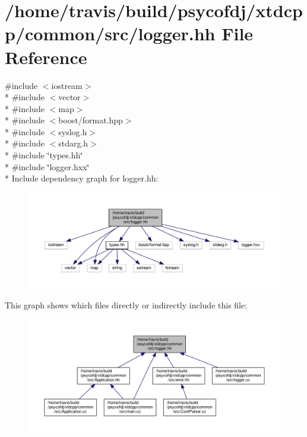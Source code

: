 \hypertarget{logger_8hh}{\section{/home/travis/build/psycofdj/xtdcpp/common/src/logger.hh File Reference}
\label{logger_8hh}
}
{\ttfamily \#include $<$iostream$>$}\\*
{\ttfamily \#include $<$vector$>$}\\*
{\ttfamily \#include $<$map$>$}\\*
{\ttfamily \#include $<$boost/format.\-hpp$>$}\\*
{\ttfamily \#include $<$syslog.\-h$>$}\\*
{\ttfamily \#include $<$stdarg.\-h$>$}\\*
{\ttfamily \#include \char`\"{}types.\-hh\char`\"{}}\\*
{\ttfamily \#include \char`\"{}logger.\-hxx\char`\"{}}\\*
Include dependency graph for logger.\-hh\-:
\nopagebreak
\begin{figure}[H]
\begin{center}
\leavevmode
\includegraphics[width=350pt]{logger_8hh__incl}
\end{center}
\end{figure}
This graph shows which files directly or indirectly include this file\-:
\nopagebreak
\begin{figure}[H]
\begin{center}
\leavevmode
\includegraphics[width=350pt]{logger_8hh__dep__incl}
\end{center}
\end{figure}
